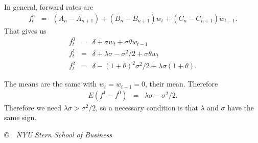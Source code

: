 \documentclass[11pt]{exam}
\begin{document}
\begin{questions}
\begin{solution}
\begin{parts}
\item In general, forward rates are
\begin{eqnarray*}
    f^n_t &=& (A_n - A_{n+1}) + (B_n - B_{n+1}) w_t + (C_n - C_{n+1}) w_{t-1} .
\end{eqnarray*}
That gives us
\begin{eqnarray*}
    f^0_t &=& \delta + \sigma w_t + \sigma \theta  w_{t-1} \\
    f^1_t &=& \delta + \lambda\sigma - \sigma^2/2 + \sigma \theta w_t  \\
    f^2_t &=& \delta - (1+\theta)^2 \sigma^2/2 + \lambda \sigma (1+\theta) .
\end{eqnarray*}

\item The means are the same with $w_t = w_{t-1} = 0$, their mean.
Therefore
\begin{eqnarray*}
   E (f^1 - f^0) &=& \lambda \sigma - \sigma^2/2 .
\end{eqnarray*}
Therefore we need $\lambda\sigma > \sigma^2/2 $,
so a necessary condition is that $\lambda$ and $\sigma$ have the same sign.

\end{parts}
\end{solution}




\end{questions}

\vfill \centerline{\it \copyright \ \number\year \ NYU Stern School of Business}
\end{document}
